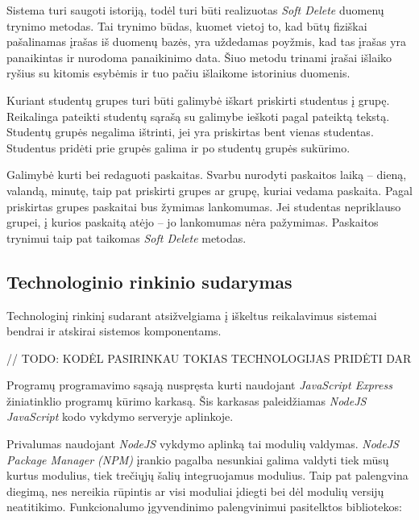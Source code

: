 \documentclass{VUMIFPSbakalaurinis}
\begin{document}
Sistema turi saugoti istoriją, todėl turi būti realizuotas \textit{Soft Delete} duomenų trynimo metodas. Tai trynimo būdas, kuomet vietoj to, kad būtų fiziškai pašalinamas įrašas iš duomenų bazės, yra uždedamas poyžmis, kad tas įrašas yra panaikintas ir nurodoma panaikinimo data. Šiuo metodu trinami įrašai išlaiko ryšius su kitomis esybėmis ir tuo pačiu išlaikome istorinius duomenis.


Kuriant studentų grupes turi būti galimybė iškart priskirti studentus į grupę. Reikalinga pateikti studentų sąrašą su galimybe ieškoti pagal pateiktą tekstą. Studentų grupės negalima ištrinti, jei yra priskirtas bent vienas studentas. Studentus pridėti prie grupės galima ir po studentų grupės sukūrimo.


Galimybė kurti bei redaguoti paskaitas. Svarbu nurodyti paskaitos laiką – dieną, valandą, minutę, taip pat priskirti grupes ar grupę, kuriai vedama paskaita. Pagal priskirtas grupes paskaitai bus žymimas lankomumas. Jei studentas nepriklauso grupei, į kurios paskaitą atėjo – jo lankomumas nėra pažymimas. Paskaitos trynimui taip pat taikomas \textit{Soft Delete} metodas.

\subsection{Technologinio rinkinio sudarymas}

Technologinį rinkinį sudarant atsižvelgiama į iškeltus reikalavimus sistemai bendrai ir atskirai sistemos komponentams.

// TODO: KODĖL PASIRINKAU TOKIAS TECHNOLOGIJAS PRIDĖTI DAR

Programų programavimo sąsają nuspręsta kurti naudojant \textit{JavaScript Express} žiniatinklio programų kūrimo karkasą. Šis karkasas paleidžiamas \textit{NodeJS} \textit{JavaScript} kodo vykdymo serveryje aplinkoje.

Privalumas naudojant \textit{NodeJS} vykdymo aplinką tai modulių valdymas. \textit{NodeJS Package Manager (NPM)} įrankio pagalba nesunkiai galima valdyti tiek mūsų kurtus modulius, tiek trečiųjų šalių integruojamus modulius. Taip pat palengvina diegimą, nes nereikia rūpintis ar visi moduliai įdiegti bei dėl modulių versijų neatitikimo. Funkcionalumo įgyvendinimo palengvinimui pasitelktos bibliotekos:
\end{document}
